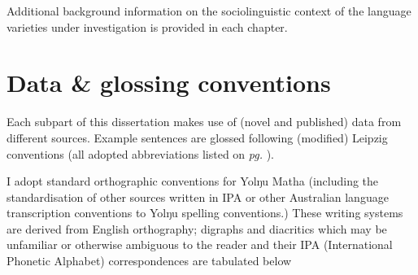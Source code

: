 \documentclass[11pt,dvipsnames]{report}
\begin{document}
Additional background information on the sociolinguistic context of the language varieties under investigation is provided in each chapter.


\section{Data \& glossing conventions}

Each subpart of this dissertation makes use of (novel and published) data from different sources. Example sentences are glossed following (modified) Leipzig conventions (all adopted abbreviations listed on \textit{pg.} \pageref{glossing}).

 I adopt standard orthographic conventions for Yolŋu Matha (including the standardisation of other sources written in IPA or other Australian language transcription conventions to Yolŋu spelling conventions.) These writing systems are derived from English orthography; digraphs and diacritics which may be unfamiliar or otherwise ambiguous to the reader and their IPA (International Phonetic Alphabet) correspondences are tabulated below \citetext{Table \ref{tab:orthogr}. See also, \textit{e.g.}, \citealt[549]{Dixon2002a} for an overview of ``canonical'' phoneme inventories in Australian Language and \citealp{Wilkinson1991} for the Yolŋu orthography (\textit{pp.} 41--4), due to Beulah Lowe and a general discussion of the Djambarrpuyŋu phoneme inventory.}
\end{document}
